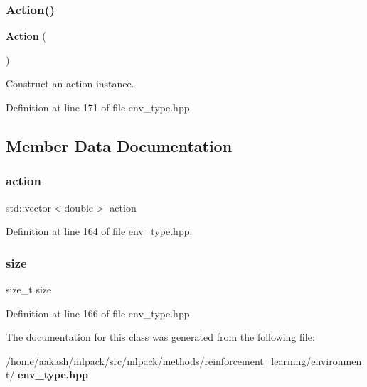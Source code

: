 \subsubsection{Action()}
{\footnotesize\ttfamily \textbf{ Action} (\begin{DoxyParamCaption}{ }\end{DoxyParamCaption})\hspace{0.3cm}{\ttfamily [inline]}}



Construct an action instance. 



Definition at line 171 of file env\+\_\+type.\+hpp.



\subsection{Member Data Documentation}
\mbox{\label{classmlpack_1_1rl_1_1ContinuousActionEnv_1_1Action_afb5d8e230f784cdcdbd42f358f0a054e}} 
\subsubsection{action}
{\footnotesize\ttfamily std\+::vector$<$double$>$ action}



Definition at line 164 of file env\+\_\+type.\+hpp.

\mbox{\label{classmlpack_1_1rl_1_1ContinuousActionEnv_1_1Action_a854352f53b148adc24983a58a1866d66}} 
\subsubsection{size}
{\footnotesize\ttfamily size\+\_\+t size\hspace{0.3cm}{\ttfamily [static]}}



Definition at line 166 of file env\+\_\+type.\+hpp.



The documentation for this class was generated from the following file\+:\begin{DoxyCompactItemize}
\item 
/home/aakash/mlpack/src/mlpack/methods/reinforcement\+\_\+learning/environment/\textbf{ env\+\_\+type.\+hpp}\end{DoxyCompactItemize}
